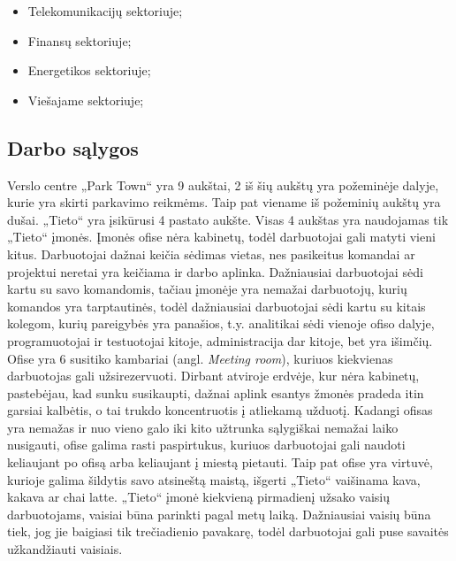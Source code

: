 \documentclass{VUMIFPSbakalaurinis}
\begin{document}
\begin{itemize}
    \item Telekomunikacijų sektoriuje;
    \item Finansų sektoriuje;
    \item Energetikos sektoriuje;
    \item Viešajame sektoriuje;
\end{itemize}

\subsection{Darbo sąlygos}
Verslo centre „Park Town“ yra 9 aukštai, 2 iš šių aukštų yra požeminėje dalyje, kurie yra skirti parkavimo reikmėms. Taip pat viename iš požeminių aukštų yra dušai. „Tieto“ yra įsikūrusi 4 pastato aukšte. Visas 4 aukštas yra naudojamas tik „Tieto“ įmonės. Įmonės ofise nėra kabinetų, todėl darbuotojai gali matyti vieni kitus. Darbuotojai dažnai keičia sėdimas vietas, nes pasikeitus komandai ar projektui neretai yra keičiama ir darbo aplinka. Dažniausiai darbuotojai sėdi kartu su savo komandomis, tačiau įmonėje yra nemažai darbuotojų, kurių komandos yra tarptautinės, todėl dažniausiai darbuotojai sėdi kartu su kitais kolegom, kurių pareigybės yra panašios, t.y. analitikai sėdi vienoje ofiso dalyje, programuotojai ir testuotojai kitoje, administracija dar kitoje, bet yra išimčių. Ofise yra 6 susitiko kambariai (angl. \textit{Meeting room}), kuriuos kiekvienas darbuotojas gali užsirezervuoti. Dirbant atviroje erdvėje, kur nėra kabinetų, pastebėjau, kad sunku susikaupti, dažnai aplink esantys žmonės pradeda itin garsiai kalbėtis, o tai trukdo koncentruotis į atliekamą užduotį. Kadangi ofisas yra nemažas ir nuo vieno galo iki kito užtrunka sąlygiškai nemažai laiko nusigauti, ofise galima rasti paspirtukus, kuriuos darbuotojai gali naudoti keliaujant po ofisą arba keliaujant į miestą pietauti. Taip pat ofise yra virtuvė, kurioje galima šildytis savo atsineštą maistą, išgerti „Tieto“ vaišinama kava, kakava ar chai latte. „Tieto“ įmonė kiekvieną pirmadienį užsako vaisių darbuotojams, vaisiai būna parinkti pagal metų laiką. Dažniausiai vaisių būna tiek, jog jie baigiasi tik trečiadienio pavakarę, todėl darbuotojai gali puse savaitės užkandžiauti vaisiais.
\end{document}
